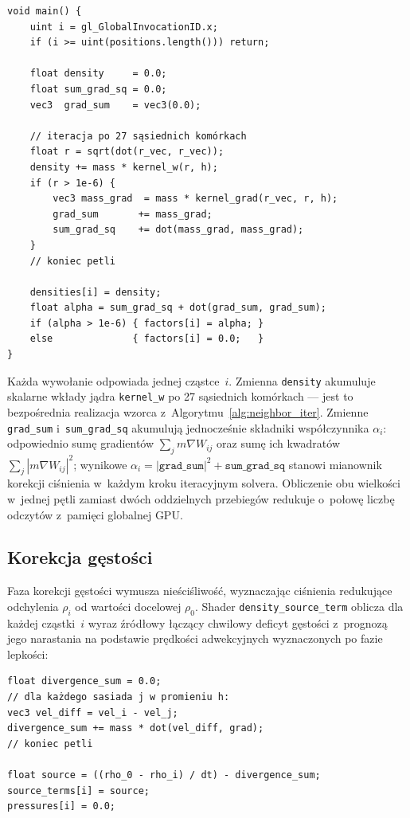 \begin{lstlisting}[caption={Shader \texttt{density\_and\_alpha} --- logika akumulacji},
                   label=lst:density_alpha,]
void main() {
    uint i = gl_GlobalInvocationID.x;
    if (i >= uint(positions.length())) return;

    float density     = 0.0;
    float sum_grad_sq = 0.0;
    vec3  grad_sum    = vec3(0.0);

    // iteracja po 27 sąsiednich komórkach
    float r = sqrt(dot(r_vec, r_vec));
    density += mass * kernel_w(r, h);
    if (r > 1e-6) {
        vec3 mass_grad  = mass * kernel_grad(r_vec, r, h);
        grad_sum       += mass_grad;
        sum_grad_sq    += dot(mass_grad, mass_grad);
    }
    // koniec petli

    densities[i] = density;
    float alpha = sum_grad_sq + dot(grad_sum, grad_sum);
    if (alpha > 1e-6) { factors[i] = alpha; }
    else              { factors[i] = 0.0;   }
}
\end{lstlisting}

Każda wywołanie odpowiada jednej cząstce~$i$.
Zmienna \texttt{density} akumuluje skalarne wkłady jądra \texttt{kernel\_w}
po 27 sąsiednich komórkach --- jest to bezpośrednia realizacja wzorca
z~Algorytmu~\ref{alg:neighbor_iter}.
Zmienne \texttt{grad\_sum} i~\texttt{sum\_grad\_sq} akumulują jednocześnie
składniki współczynnika $\alpha_i$: odpowiednio sumę gradientów
$\sum_j m\nabla W_{ij}$ oraz sumę ich kwadratów $\sum_j |m\nabla W_{ij}|^2$;
wynikowe $\alpha_i = |\texttt{grad\_sum}|^2 + \texttt{sum\_grad\_sq}$
stanowi mianownik korekcji ciśnienia w~każdym kroku iteracyjnym solvera.
Obliczenie obu wielkości w~jednej pętli zamiast dwóch oddzielnych
przebiegów redukuje o~połowę liczbę odczytów z~pamięci globalnej GPU.



\subsection{Korekcja gęstości}
\label{subsec:density_correction}

Faza korekcji gęstości wymusza nieściśliwość, wyznaczając ciśnienia redukujące 
odchylenia $\rho_i$ od wartości docelowej $\rho_0$.
Shader \texttt{density\_source\_term} oblicza dla każdej cząstki~$i$
wyraz źródłowy łączący chwilowy deficyt gęstości z~prognozą jego narastania
na podstawie prędkości adwekcyjnych wyznaczonych po fazie lepkości:

\begin{lstlisting}[caption={Shader \texttt{density\_source\_term} --- wyraz źródłowy solvera gęstości},
                   label=lst:density_source,]
float divergence_sum = 0.0;
// dla każdego sasiada j w promieniu h:
vec3 vel_diff = vel_i - vel_j;
divergence_sum += mass * dot(vel_diff, grad);
// koniec petli

float source = ((rho_0 - rho_i) / dt) - divergence_sum;
source_terms[i] = source;
pressures[i] = 0.0;
\end{lstlisting}

